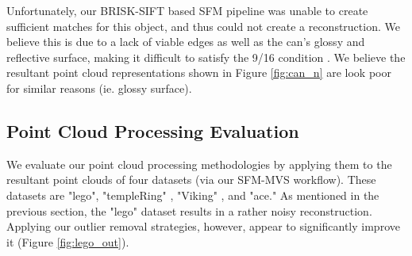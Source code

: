 \documentclass[conference,compsoc]{IEEEtran}
\begin{document}
Unfortunately, our BRISK-SIFT based SFM pipeline was unable to create 
sufficient matches for this object,
and thus could not create a reconstruction. We believe this is due to
a lack of viable edges as well as the can's glossy and reflective surface, 
making it difficult to satisfy the 9/16 condition \cite{brisk}. 
We believe the resultant point cloud representations shown in Figure \ref{fig:can_n}
are look poor for similar reasons (ie. glossy surface). 



\subsection{Point Cloud Processing Evaluation}
We evaluate our point cloud processing methodologies by applying them 
to the resultant point clouds of four datasets (via our SFM-MVS workflow).
These datasets are "lego", "templeRing" \cite{temple}, "Viking" \cite{viking}, 
and "ace." As mentioned in 
the previous section, the "lego" dataset results in a rather noisy reconstruction. 
Applying our outlier removal strategies, however, appear to significantly improve
it (Figure \ref{fig:lego_out}).
\end{document}
